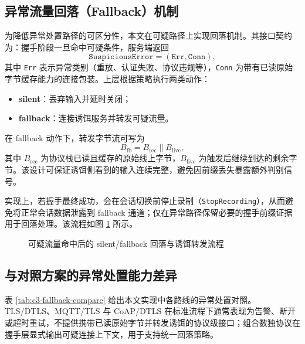 \subsection{异常流量回落（Fallback）机制}
为降低异常处置路径的可区分性，本文在可疑路径上实现回落机制。其接口契约为：握手阶段一旦命中可疑条件，服务端返回
\[
\texttt{SuspiciousError}=(\texttt{Err},\texttt{Conn}),
\]
其中 \texttt{Err} 表示异常类别（重放、认证失败、协议违规等），\texttt{Conn} 为带有已读原始字节缓存能力的连接包装。上层根据策略执行两类动作：
\begin{itemize}
  \item \textbf{silent}：丢弃输入并延时关闭；
  \item \textbf{fallback}：连接诱饵服务并转发可疑流量。
\end{itemize}

在 fallback 动作下，转发字节流可写为
\[
B_{\mathrm{fb}} = B_{\mathrm{rec}} \parallel B_{\mathrm{live}},
\]
其中 $B_{\mathrm{rec}}$ 为协议栈已读且缓存的原始线上字节，$B_{\mathrm{live}}$ 为触发后继续到达的剩余字节。该设计可保证诱饵侧看到的输入连续完整，避免因前缀丢失暴露额外判别信号。

实现上，若握手最终成功，会在会话切换前停止录制（\texttt{StopRecording}），从而避免将正常会话数据泄露到 fallback 通道；仅在异常路径保留必要的握手前缀证据用于回落处理。该流程如图 \ref{fig:c3-fallback-flow} 所示。

\begin{figure}[htbp]
\centering
\small
{}
\caption{可疑流量命中后的 silent/fallback 回落与诱饵转发流程}
\label{fig:c3-fallback-flow}
\end{figure}

\subsection{与对照方案的异常处置能力差异}
表 \ref{tab:c3-fallback-compare} 给出本文实现中各路线的异常处置对照。TLS/DTLS、MQTT/TLS 与 CoAP/DTLS 在标准流程下通常表现为告警、断开或超时重试，不提供携带已读原始字节并转发诱饵的协议级接口；组合数独协议在握手层显式输出可疑连接上下文，用于支持统一回落策略\cite{rfc8446,rfc9147,mqtt311,rfc7252}。

